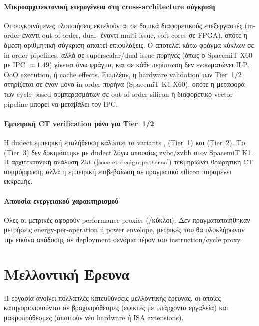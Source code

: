\paragraph{Μικροαρχιτεκτονική ετερογένεια στη cross-architecture σύγκριση}
Οι συγκρινόμενες υλοποιήσεις εκτελούνται σε δομικά διαφορετικούς επεξεργαστές
(in-order έναντι out-of-order, dual- έναντι multi-issue, soft-cores σε FPGA), 
οπότε η άμεση αριθμητική σύγκριση απαιτεί
επιφυλάξεις. Ο \instret αποτελεί κάτω φράγμα κύκλων σε in-order pipelines, αλλά σε
superscalar/dual-issue πυρήνες (όπως ο SpacemiT X60 με IPC $\approx 1.49$) γίνεται
άνω φράγμα, και σε κάθε περίπτωση δεν ενσωματώνει ILP, OoO execution, ή cache
effects. Επιπλέον, η hardware validation των Tier~1/2 στηρίζεται σε έναν μόνο
in-order πυρήνα (SpacemiT K1 X60), οπότε η μεταφορά των cycle-based συμπερασμάτων
σε out-of-order silicon ή διαφορετικό vector pipeline μπορεί να μεταβάλει τον IPC.

\ifTODO
\paragraph{Εμπειρική CT verification μόνο για Tier~1/2}
Η dudect εμπειρική επαλήθευση καλύπτει τα variants , 
(Tier~1) και  (Tier~2). Το 
(Tier~3) δεν δοκιμάστηκε με dudect λόγω απουσίας \gls{zvbc}/\gls{zvbb} στον SpacemiT K1.
Η αρχιτεκτονική ανάλυση Zkt (\cref{ssec:ct-design-patterns}) τεκμηριώνει
θεωρητική CT συμμόρφωση, αλλά η εμπειρική επιβεβαίωση σε πραγματικό silicon
παραμένει εκκρεμής.

\fi

\paragraph{Απουσία ενεργειακού χαρακτηρισμού}
Όλες οι μετρικές αφορούν performance proxies (\instret/κύκλοι). Δεν πραγματοποιήθηκαν
μετρήσεις energy-per-operation ή power envelope, μετρικές που θα ολοκλήρωναν την
εικόνα απόδοσης σε deployment σενάρια πέραν του instruction/cycle proxy.

\section{Μελλοντική Έρευνα}
\label{sec:future-work}

Η εργασία ανοίγει πολλαπλές κατευθύνσεις μελλοντικής έρευνας, οι οποίες
κατηγοριοποιούνται σε βραχυπρόθεσμες (εφικτές με υπάρχοντα εργαλεία) και
μακροπρόθεσμες (απαιτούν νέο hardware ή ISA extensions).

